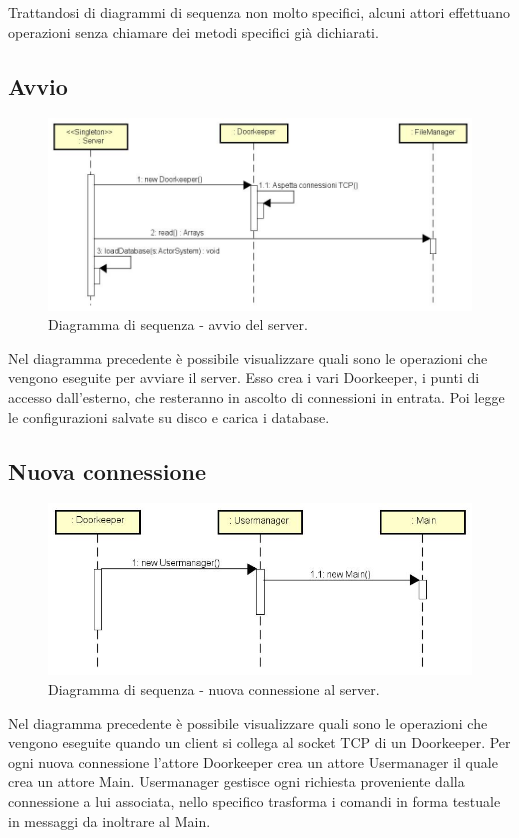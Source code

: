 \documentclass[a4paper]{article}
\begin{document}
        Trattandosi di diagrammi di sequenza non molto specifici, alcuni attori effettuano operazioni senza chiamare dei metodi specifici già 
        dichiarati. 
       \subsection{Avvio}
            \begin{figure} [H]
				\centering
				\includegraphics[width=\textwidth]{ST/Sequenza/seqAvvio.jpg}
				\caption{Diagramma di sequenza - avvio del server.}
			\end{figure}
            Nel diagramma precedente è possibile visualizzare quali sono le operazioni che vengono eseguite per avviare il server. Esso crea i vari Doorkeeper, i punti di accesso dall'esterno, che resteranno in ascolto di connessioni in entrata. Poi legge le configurazioni salvate su disco e carica i database.
             
       \subsection{Nuova connessione}
            \begin{figure} [H]
				\centering
				\includegraphics[width=\textwidth]{ST/Sequenza/seqNuovaConnessione.jpg}
				\caption{Diagramma di sequenza - nuova connessione al server.}
			\end{figure}
            Nel diagramma precedente è possibile visualizzare quali sono le operazioni che vengono eseguite quando un client si collega al socket TCP di un Doorkeeper. Per ogni nuova connessione l'attore Doorkeeper crea un attore Usermanager il quale crea un attore Main. Usermanager gestisce ogni richiesta proveniente dalla connessione a lui associata, nello specifico trasforma i comandi in forma testuale in messaggi da inoltrare al Main.
            
\end{document}
